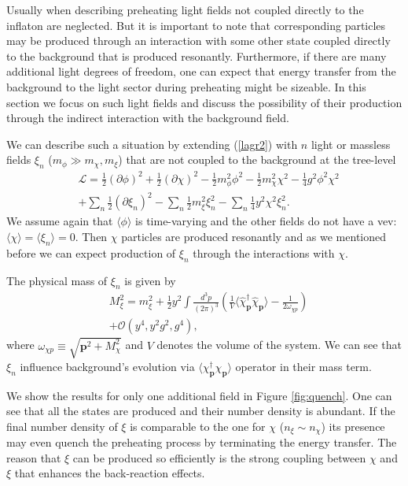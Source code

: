 \documentclass[twocolumn,showpacs,preprintnumbers,amsmath,amssymb,nofootinbib,superscriptaddress,prc]{revtex4}
\begin{document}
Usually when describing preheating light fields not coupled directly to the inflaton are neglected. But it is important to note that corresponding particles may be produced through an interaction with some other state coupled directly to the background that is produced resonantly. Furthermore, if there are many additional light degrees of freedom, one can expect that energy transfer from the background to the light sector during preheating might be sizeable. In this section we focus on such light fields and discuss the possibility of their production through the indirect interaction with the background field.

We can describe such a situation by extending (\ref{lagr2}) with $n$ light or massless fields $\xi_n$ ($m_\phi \gg m_\chi, m_\xi$) that are not coupled to the background at the tree-level
\begin{eqnarray}
& \nonumber \mathcal{L} = \frac{1}{2}(\partial \phi)^2 + \frac{1}{2}(\partial \chi)^2 - \frac{1}{2}m_\phi^2 \phi^2 - \frac{1}{2}m_\chi^2 \chi^2 - \frac{1}{4}g^2\phi^2\chi^2 \\
& + \sum_n\frac{1}{2}(\partial \xi_n)^2 - \sum_n\frac{1}{2}m_\xi^2 \xi_n^2 - \sum_n\frac{1}{4}y^2\chi^2\xi_n^2.
\end{eqnarray}
We assume again that $\langle \phi \rangle$ is time-varying and the other fields do not have a vev: $ \langle \chi \rangle = \langle \xi_n \rangle = 0 $. Then $\chi$ particles are produced resonantly and as we mentioned before we can expect production of $\xi_n$ through the interactions with $\chi$.

The physical mass of $\xi_n$ is given by
\begin{eqnarray}
\nonumber & M^2_{\xi} = m_{\xi}^2 + \frac{1}{2} y^2 \int \frac{d^3 p}{(2 \pi)^3} \left( \frac{1}{V} \langle \hat{\chi}^{\dagger}_{\textbf{p}} \hat{\chi}_{\textbf{p}} \rangle - \frac{1}{2 \omega_{\chi p}} \right) \\
& + \mathcal{O} (y^4, y^2 g^2, g^4),
\end{eqnarray}
where $\omega_{\chi p} \equiv \sqrt{\textbf{p}^2 + M_{\chi}^2} $ and $V$ denotes the volume of the system. We can see that $\xi_n$ influence background's evolution via $\langle \chi^{\dagger}_{\textbf{p}} \chi_{\textbf{p}} \rangle$ operator in their mass term.

We show the results for only one additional field in Figure \ref{fig:quench}. One can see that all the states are produced and their number density is abundant. If the final number density of $\xi$ is comparable to the one for $\chi$ ($n_{\xi} \sim n_{\chi}$) its presence may even quench the preheating process by terminating the energy transfer. The reason that $\xi$ can be produced so efficiently is the strong coupling between $\chi$ and $\xi$ that enhances the back-reaction effects.
\end{document}
